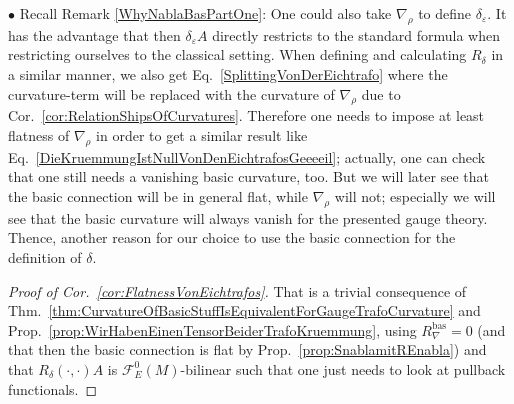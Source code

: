 \begin{remark}
$\bullet$ Recall Remark \ref{WhyNablaBasPartOne}: One could also take $\nabla_\rho$ to define $\delta_\varepsilon$. It has the advantage that then $\delta_\varepsilon A$ directly restricts to the standard formula when restricting ourselves to the classical setting. When defining and calculating $R_\delta$ in a similar manner,
we also get Eq.~\eqref{SplittingVonDerEichtrafo} where the curvature-term will be replaced with the curvature of $\nabla_\rho$ due to Cor.~\ref{cor:RelationShipsOfCurvatures}. Therefore one needs to impose at least flatness of $\nabla_\rho$ in order to get a similar result like Eq.~\eqref{DieKruemmungIstNullVonDenEichtrafosGeeeeil}; actually, one can check that one still needs a vanishing basic curvature, too.
But we will later see that the basic connection will be in general flat, while $\nabla_\rho$ will not; especially we will see that the basic curvature will always vanish for the presented gauge theory. Thence, another reason for our choice to use the basic connection for the definition of $\delta$.
\end{remark}

\begin{proof}[Proof of Cor.~\ref{cor:FlatnessVonEichtrafos}]
\leavevmode\newline
That is a trivial consequence of Thm.~\ref{thm:CurvatureOfBasicStuffIsEquivalentForGaugeTrafoCurvature} and Prop.~\ref{prop:WirHabenEinenTensorBeiderTrafoKruemmung}, using $R_\nabla^{\mathrm{bas}}=0$ (and that then the basic connection is flat by Prop.~\ref{prop:SnablamitREnabla}) and that $R_\delta(\cdot, \cdot)A$ is $\mathcal{F}^0_E(M)$-bilinear such that one just needs to look at pullback functionals.
\end{proof}

